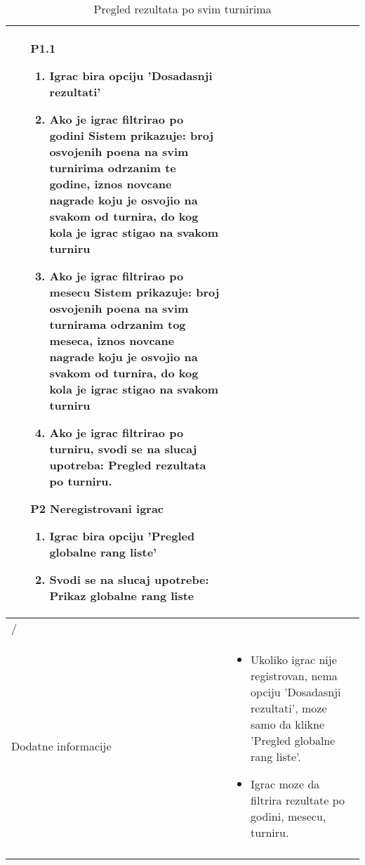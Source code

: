 \documentclass{article}
\begin{document}
\begin{longtable}{| p{} | p{} |}
\begin{itemize}
\begin{enumerate}
            \end{enumerate}
        \item [P1.1]
            \begin{enumerate}
                \item Igrac bira opciju 'Dosadasnji rezultati'
                \item Ako je igrac filtrirao po godini 
                    \newline Sistem prikazuje: broj osvojenih poena na svim turnirima odrzanim te godine, iznos novcane nagrade koju je osvojio na svakom od turnira, do kog kola je igrac stigao na svakom turniru 
                \item Ako je igrac filtrirao po mesecu 
                    \newline Sistem prikazuje: broj osvojenih poena na svim turnirama odrzanim tog meseca, iznos novcane nagrade koju je osvojio na svakom od turnira, do kog kola je igrac stigao na svakom turniru
                \item Ako je igrac filtrirao po turniru, svodi se na slucaj upotreba: Pregled rezultata po turniru.
            \end{enumerate}
        \item [P2] Neregistrovani igrac
            \begin{enumerate}
                \item Igrac bira opciju 'Pregled globalne rang liste'
                \item Svodi se na slucaj upotrebe: Prikaz globalne rang liste
            \end{enumerate}
    \end{itemize}\\
\hline
    /\\
\hline
    Dodatne informacije & \begin{itemize}
        \item Ukoliko igrac nije registrovan, nema opciju 'Dosadasnji rezultati', moze samo da klikne 'Pregled globalne rang liste'.
        \item Igrac moze da filtrira rezultate po godini, mesecu, turniru.
    \end{itemize} \\
\hline
\caption{Pregled rezultata po svim turnirima} %
\end{longtable}


\end{document}

